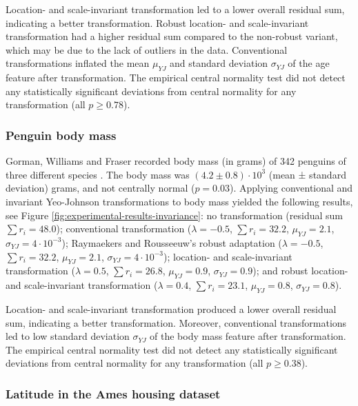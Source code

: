 \documentclass[preprint,12pt,authoryear]{elsarticle}
\begin{document}
Location- and scale-invariant transformation led to a lower overall
residual sum, indicating a better transformation. Robust location- and
scale-invariant transformation had a higher residual sum compared to the
non-robust variant, which may be due to the lack of outliers in the
data. Conventional transformations inflated the mean \(\mu_{YJ}\) and
standard deviation \(\sigma_{YJ}\) of the age feature after
transformation. The empirical central normality test did not detect any
statistically significant deviations from central normality for any
transformation (all \(p \geq 0.78\)).

\subsubsection{Penguin body mass}\label{sec:penguin-body-mass}

Gorman, Williams and Fraser recorded body mass (in grams) of 342
penguins of three different species \citep{Gorman2014-eo}.
The body mass was \((4.2 \pm 0.8) \cdot 10^3\) (mean ± standard
deviation) grams, and not centrally normal (\(p = 0.03\)). Applying
conventional and invariant Yeo-Johnson transformations to body mass
yielded the following results, see Figure
\ref{fig:experimental-results-invariance}: no transformation (residual
sum \(\sum r_i = 48.0\)); conventional transformation
(\(\lambda = -0.5\), \(\sum r_i = 32.2\), \(\mu_{YJ} = 2.1\),
\(\sigma_{YJ} = 4 \cdot 10^{-3}\)); Raymaekers and Rousseeuw's robust
adaptation (\(\lambda = -0.5\), \(\sum r_i = 32.2\), \(\mu_{YJ} = 2.1\),
\(\sigma_{YJ} = 4 \cdot 10^{-3}\)); location- and scale-invariant
transformation (\(\lambda = 0.5\), \(\sum r_i = 26.8\),
\(\mu_{YJ} = 0.9\), \(\sigma_{YJ} = 0.9\)); and robust location- and
scale-invariant transformation (\(\lambda = 0.4\), \(\sum r_i = 23.1\),
\(\mu_{YJ} = 0.8\), \(\sigma_{YJ} = 0.8\)).

Location- and scale-invariant transformation produced a lower overall
residual sum, indicating a better transformation. Moreover, conventional
transformations led to low standard deviation \(\sigma_{YJ}\) of the
body mass feature after transformation. The empirical central normality
test did not detect any statistically significant deviations from
central normality for any transformation (all \(p \geq 0.38\)).

\subsubsection{Latitude in the Ames housing
dataset}\label{sec:latitude-in-the-ames-housing-dataset}
\end{document}
